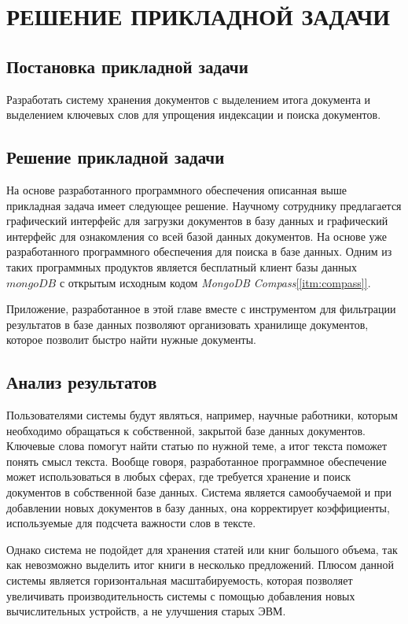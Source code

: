 \chapter{РЕШЕНИЕ ПРИКЛАДНОЙ ЗАДАЧИ}

\section{Постановка прикладной задачи}

Разработать систему хранения  документов с выделением итога документа и выделением ключевых слов для упрощения индексации и поиска документов. 

\section{Решение прикладной задачи}

На основе разработанного программного обеспечения описанная выше прикладная задача имеет следующее решение. Научному сотруднику предлагается графический интерфейс для загрузки документов в базу данных и графический интерфейс для ознакомления со всей базой данных документов. На основе уже разработанного программного обеспечения для поиска в базе данных. Одним из таких программных продуктов является бесплатный клиент базы данных $mongoDB$ с открытым исходным кодом \textit{MongoDB Compass}\hyperref[itm:compass]{[\ref{itm:compass}]}.

Приложение, разработанное в этой главе вместе с инструментом для фильтрации результатов в базе данных позволяют организовать хранилище документов, которое позволит быстро найти нужные документы.

\section{Анализ результатов}

Пользователями системы будут являться, например, научные работники, которым необходимо обращаться к собственной, закрытой базе данных документов. Ключевые слова помогут найти статью по нужной теме, а итог текста поможет понять смысл текста. Вообще говоря, разработанное программное обеспечение может использоваться в любых сферах, где требуется хранение и поиск документов в собственной базе данных. Система является самообучаемой и при добавлении новых документов в базу данных, она корректирует коэффициенты, используемые для подсчета важности слов в тексте.

Однако система не подойдет для хранения статей или книг большого объема, так как невозможно выделить итог книги в несколько предложений. Плюсом данной системы является горизонтальная масштабируемость, которая позволяет увеличивать производительность системы с помощью добавления новых вычислительных устройств, а не улучшения старых ЭВМ.

